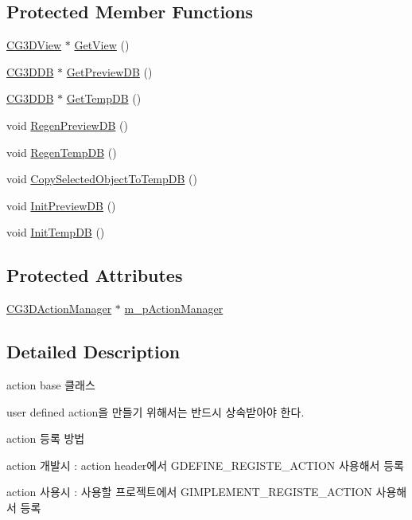 \subsection*{Protected Member Functions}
\begin{DoxyCompactItemize}
\item 
\hyperlink{class_c_g3_d_view}{C\+G3\+D\+View} $\ast$ \hyperlink{class_c_g3_d_action_base_a6e757eaf80d683ffa8135ea9bd96a2fe}{Get\+View} ()
\item 
\hyperlink{class_c_g3_d_d_b}{C\+G3\+D\+D\+B} $\ast$ \hyperlink{class_c_g3_d_action_base_a97055aeec3945e4a3e2d8fa3220bf72d}{Get\+Preview\+D\+B} ()
\item 
\hyperlink{class_c_g3_d_d_b}{C\+G3\+D\+D\+B} $\ast$ \hyperlink{class_c_g3_d_action_base_afc020dab8a8fb86f643a34cdda80950b}{Get\+Temp\+D\+B} ()
\item 
void \hyperlink{class_c_g3_d_action_base_ac81883ef5f75fe587402c8794d5a9d49}{Regen\+Preview\+D\+B} ()
\item 
void \hyperlink{class_c_g3_d_action_base_af6bdb36241f4847ae226754aa8948498}{Regen\+Temp\+D\+B} ()
\item 
void \hyperlink{class_c_g3_d_action_base_a58084365c4d61d4684597372cc0afdf2}{Copy\+Selected\+Object\+To\+Temp\+D\+B} ()
\item 
void \hyperlink{class_c_g3_d_action_base_a921e97525d3a11bac2882199eb12f3f8}{Init\+Preview\+D\+B} ()
\item 
void \hyperlink{class_c_g3_d_action_base_a0e0de7381aa1df300e89f3dabc75321d}{Init\+Temp\+D\+B} ()
\end{DoxyCompactItemize}
\subsection*{Protected Attributes}
\begin{DoxyCompactItemize}
\item 
\hyperlink{class_c_g3_d_action_manager}{C\+G3\+D\+Action\+Manager} $\ast$ \hyperlink{class_c_g3_d_action_base_a39cdc8513129f06a4ac45e9b56ce499c}{m\+\_\+p\+Action\+Manager}
\end{DoxyCompactItemize}


\subsection{Detailed Description}

\begin{DoxyItemize}
\item action base 클래스
\item user defined action을 만들기 위해서는 반드시 상속받아야 한다.
\item action 등록 방법
\begin{DoxyItemize}
\item action 개발시 \+: action header에서 G\+D\+E\+F\+I\+N\+E\+\_\+\+R\+E\+G\+I\+S\+T\+E\+\_\+\+A\+C\+T\+I\+O\+N 사용해서 등록
\item action 사용시 \+: 사용할 프로젝트에서 G\+I\+M\+P\+L\+E\+M\+E\+N\+T\+\_\+\+R\+E\+G\+I\+S\+T\+E\+\_\+\+A\+C\+T\+I\+O\+N 사용해서 등록 
\end{DoxyItemize}
\end{DoxyItemize}

